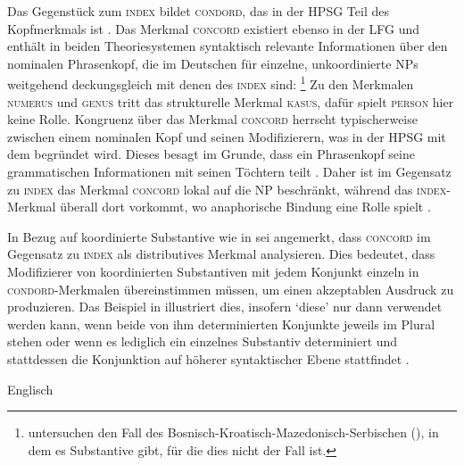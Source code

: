 \label{phsec:concord}
Das Gegenstück zum \textsc{index} bildet \textsc{condord}, das in der HPSG Teil
des Kopfmerkmals ist \autocite[17]{wechslerzlatic2003}. Das Merkmal
\textsc{concord} existiert ebenso in der LFG
\autocite[189--192]{bresnanetal2016} und enthält in beiden Theoriesystemen
syntaktisch relevante Informationen über den nominalen Phrasenkopf, die im
Deutschen für einzelne, unkoordinierte NPs weitgehend
deckungsgleich mit denen des \textsc{index} sind:%
%
	\footnote{\citet{wechslerzlatic2003} untersuchen den Fall des
	Bosnisch-Kroatisch-Mazedonisch-Serbischen (), in dem es
	Substantive gibt, für die dies nicht der Fall ist.}
%
Zu den Merkmalen \textsc{numerus} und \textsc{genus} tritt das strukturelle
Merkmal \textsc{kasus}, dafür spielt \textsc{person} hier keine Rolle.
Kongruenz über das Merkmal \textsc{concord} herrscht typischerweise zwischen
einem nominalen Kopf und seinen Modifizierern, was in der HPSG mit dem
 begründet wird. Dieses besagt im Grunde, dass ein
Phrasenkopf seine grammatischen Informationen mit seinen Töchtern teilt
\autocite[vgl.][22]{wechslerzlatic2003}. Daher ist im Gegensatz zu
\textsc{index} das Merkmal \textsc{concord} lokal auf die NP beschränkt,
während das \textsc{index}-Merkmal überall dort vorkommt, wo anaphorische
Bindung eine Rolle spielt
\parencites[14--16, 22]{wechslerzlatic2003}[189]{bresnanetal2016}.

In Bezug auf koordinierte Substantive wie in  sei angemerkt,
dass \citet[76--78]{kingdalrymple2004} \textsc{concord} im Gegensatz zu
\textsc{index} als distributives Merkmal analysieren. Dies bedeutet, dass
Modifizierer von koordinierten Substantiven mit jedem Konjunkt einzeln in
\textsc{condord}-Merkmalen übereinstimmen müssen, um einen akzeptablen Ausdruck
zu produzieren. Das Beispiel in  illustriert dies,
insofern  `diese' nur dann verwendet werden kann, wenn beide von ihm
determinierten Konjunkte jeweils im Plural stehen 
oder wenn es lediglich ein einzelnes Substantiv determiniert und stattdessen
die Konjunktion auf höherer syntaktischer Ebene stattfindet
.

\begin{exe}
\ex\label{ex:engartdiscong}
	\langinfo%
		{Englisch}
		{}
		{\cite[nach][70]{kingdalrymple2004}}
	\begin{xlist}
		\label{ex:engartdiscong_1}
		\label{ex:engartdiscong_2}
		\label{ex:engartdiscong_3}
		\label{ex:engartdiscong_4}
	\end{xlist}
\end{exe}

